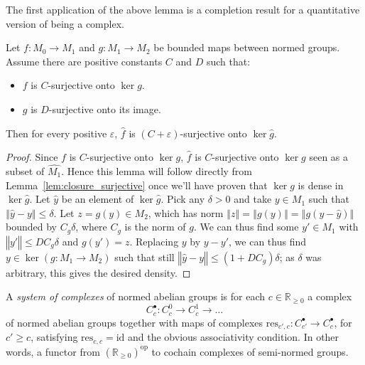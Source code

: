 The first application of the above lemma is a completion result for
a quantitative version of being a complex.

\begin{lemma}\label{lem:controlled_exactness}
  \leanok
  Let $f : M_0 → M_1$ and $g : M_1 → M_2$ be bounded maps between normed groups.
  Assume there are positive constants $C$ and $D$ such that:
  \begin{itemize}
    \item
      $f$ is $C$-surjective onto $\ker g$.
    \item
      $g$ is $D$-surjective onto its image.
  \end{itemize}
  Then for every positive $ε$, $\widehat{f}$ is $(C + ε)$-surjective onto
  $\ker \widehat{g}$.
\end{lemma}

\begin{proof}\leanok
  Since $f$ is $C$-surjective onto $\ker g$, $\widehat{f}$ is $C$-surjective
  onto $\ker g$ seen as a subset of $\widehat{M_1}$. Hence this lemma will
  follow directly from Lemma~\ref{lem:closure_surjective}
  once we'll have proven that $\ker g$ is dense in $\ker \widehat{g}$.
  Let $\widehat y$ be an element of $\ker \widehat{g}$.
  Pick any $\delta > 0$ and take $y\in M_1$ such that
  $‖\widehat{y}-y‖\leq \delta$. Let $z=g(y)\in M_2$, which has norm
  $‖z‖=‖g(y)‖=‖g(y-\widehat{y})‖$ bounded by
  $C_{g}\delta$, where $C_{g}$ is the norm of $g$. We can thus find some
  $y'\in M_1$ with $‖y'‖\leq DC_{g}\delta$ and $g(y')=z$. Replacing $y$ by
  $y-y'$, we can thus find $y\in \ker(g: M_1\to M_2)$ such that still
  $‖\widehat{y}-y‖\leq (1+DC_{g})\delta$; as $\delta$ was arbitrary, this
  gives the desired density.
\end{proof}

\begin{definition}
  \label{system_of_complexes}
  \leanok
  A \emph{system of complexes} of normed abelian groups
  is for each $c \in \mathbb R_{\ge 0}$
  a complex
  \[
  C_c^\bullet: C_c^0\to C_c^1\to\ldots
  \]
  of normed abelian groups together with maps of complexes
  $\mathrm{res}_{c',c}: C_{c'}^\bullet\to C_c^\bullet$,
  for $c' ≥ c$,
  satisfying $\mathrm{res}_{c,c}=\mathrm{id}$ and the obvious associativity condition.
  In other words, a functor from $(\mathbb R_{\ge 0})^{\mathrm{op}}$ to
  cochain complexes of semi-normed groups.
\end{definition}

